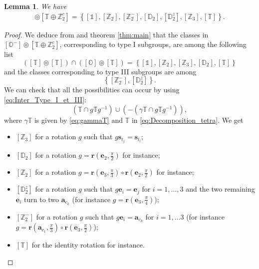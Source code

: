 \documentclass[11pt,a4paper]{amsart}
\newtheorem{lem}[thm]{Lemma}
\theoremstyle{definition}
\newcommand{\ZZ}{\mathbb{Z}}                %
\newcommand{\octa}{\mathbb{O}}              %
\newcommand{\ico}{\mathbb{I}}               %
\newcommand{\tetra}{\mathbb{T}}             %
\newcommand{\DD}{\mathbb{D}}                %
\newcommand{\1}{\mathds{1}}		            %
\newcommand{\ee}{\pmb{e}}                   %
\newcommand{\vR}{\mathbf{r}}
\newcommand{\set}[1]{\left\{#1\right\}}     %
\begin{document}

\begin{lem}
  We have
  \begin{align*}
      [\octa^-] \circledcirc [\tetra \oplus \ZZ_2^c]=\set{[\1],[\ZZ_2],[\ZZ_2^-],[\DD_2],[\DD_2^z],[\ZZ_3],[\tetra]}.                  
  \end{align*}
\end{lem}



\begin{proof}
		We deduce from \cite[table 1]{Olive2019} and theorem \ref{thm:main} that the classes in $[\octa^-]\circledcirc [\tetra\oplus \ZZ_2^c]$, corresponding to type I subgroups, are among the following list
	\begin{equation*}
		([\tetra]\circledcirc [\tetra])\cap ([\octa]\circledcirc[\tetra])=\set{[\1],[\ZZ_{2}],[\ZZ_{3}],[\DD_{2}],[\tetra]}
	\end{equation*}
	and the classes corresponding to type III subgroups are among
	\begin{equation*}
		\set{[\ZZ_2^-],[\DD_{2}^z]}.
	\end{equation*}
	We can check that all the possibilities can occur by using \eqref{eq:Inter_Type_I_et_III}:
	\begin{equation*}
		(\tetra\cap g \tetra g^{-1})\cup (-(\gamma\tetra\cap g \tetra g^{-1})),
	\end{equation*}
	where $ \gamma\tetra$ is given by \eqref{eq:gammaT} and $\tetra$ in \eqref{eq:Decomposition_tetra}.
	We get
	\begin{itemize}
		\item $[\ZZ_{3}]$ for a rotation $g$ such that $g\pmb{s}_{t_j}=\pmb{s}_{t_l}$;
		\item $[\DD_{2}]$ for a rotation $g=\vR\left(\ee_2,\frac{\pi}{2}\right)$ for instance;
		\item $[\ZZ_{2}]$ for a rotation $g=\vR\left(\ee_3,\frac{\pi}{3}\right)\circ\vR\left(\ee_2,\frac{\pi}{2}\right)$ for instance;
		\item $[\DD_{2}^z]$ for a rotation $g$ such that $g\ee_i= \ee_j$ for $i=1,\dotsc,3$ and the two remaining $\ee_i$ turn to two $\pmb{a}_{c_k}$ (for instance $g=\vR\left(\ee_3,\frac{\pi}{4}\right)$);
		\item $[\ZZ_2^-]$ for a rotation $g$ such that $g\ee_i= \pmb{a}_{c_k}$ for $ i=1,\dotsc 3$ (for instance $g=\vR\left(\pmb{a}_{c_1},\frac{\pi}{3}\right)\circ\vR\left(\ee_3,\frac{\pi}{2}\right)$);
		\item $[\tetra]$ for the identity rotation for instance.
	\end{itemize}
\end{proof}
\end{document}
